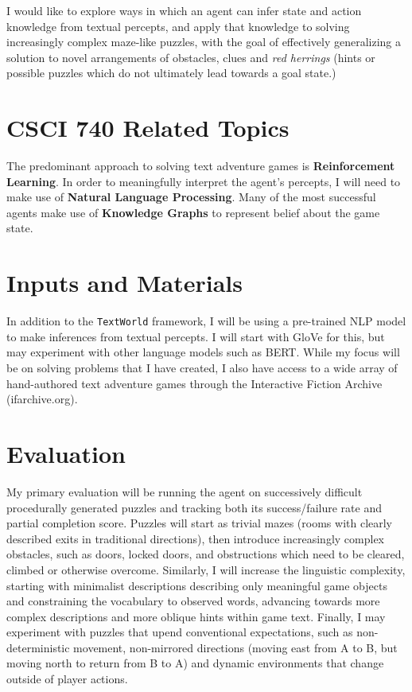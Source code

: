 \documentclass{article}
\begin{document}
I would like to explore ways in which an agent can infer state and
action knowledge from textual percepts, and apply that knowledge to
solving increasingly complex maze-like puzzles, with the goal of
effectively generalizing a solution to novel arrangements of obstacles,
clues and \emph{red herrings} (hints or possible puzzles which do not
ultimately lead towards a goal state.)

\section{CSCI 740 Related Topics}

The predominant approach to solving text adventure games is
\textbf{Reinforcement Learning}. In order to meaningfully interpret the
agent's percepts, I will need to make use of \textbf{Natural Language
Processing}. Many of the most successful agents make use of
\textbf{Knowledge Graphs} to represent belief about the game
state\cite{dambekodi_playing_2020}.

\section{Inputs and Materials}

In addition to the \texttt{TextWorld} framework, I will be using a
pre-trained NLP model to make inferences from textual percepts. I will
start with GloVe for this, but may experiment with other language models
such as BERT. While my focus will be on solving problems that I have
created, I also have access to a wide array of hand-authored text
adventure games through the Interactive Fiction Archive (ifarchive.org).

\section{Evaluation}

My primary evaluation will be running the agent on successively
difficult procedurally generated puzzles and tracking both its
success/failure rate and partial completion score. Puzzles will start as
trivial mazes (rooms with clearly described exits in traditional
directions), then introduce increasingly complex obstacles, such as
doors, locked doors, and obstructions which need to be cleared, climbed or
otherwise overcome. Similarly, I will increase the linguistic
complexity, starting with minimalist descriptions describing only
meaningful game objects and constraining the vocabulary to observed
words, advancing towards more complex descriptions and more oblique
hints within game text. Finally, I may experiment with puzzles that
upend conventional expectations, such as non-deterministic movement,
non-mirrored directions (moving east from A to B, but moving north to
return from B to A) and dynamic environments that change outside of
player actions.
\end{document}
